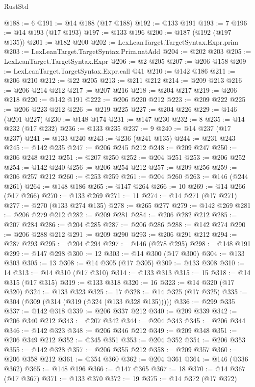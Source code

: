 \begin{lexlean}{RustStd}
\begin{coremodule}
@188 := 6
@191 := @14 @188 (@17 @188)
@192 := @133 @191
@193 := 7
@196 := @14 @193 (@17 @193)
@197 := @133 @196
@200 := @187 (@192 (@197 @135))
@201 := @182 @200
@202 := LexLeanTarget.TargetSyntax.Expr.prim
@203 := LexLeanTarget.TargetSyntax.Prim.natAdd
@204 := @202 @203
@205 := LexLeanTarget.TargetSyntax.Expr
@206 := @2 @205
@207 := @206 @158
@209 := LexLeanTarget.TargetSyntax.Expr.call @41
@210 := @142 @186
@211 := @206 @210
@212 := @22 @205
@213 := @211 @212
@214 := @209 @213
@216 := @206 @214 @212
@217 := @207 @216
@218 := @204 @217
@219 := @206 @218
@220 := @142 @191
@222 := @206 @220 @212
@223 := @209 @222
@225 := @206 @223 @212
@226 := @219 @225
@227 := @204 @226
@229 := @146 (@201 @227)
@230 := @148 @174
@231 := @147 @230
@232 := 8
@235 := @14 @232 (@17 @232)
@236 := @133 @235
@237 := 9
@240 := @14 @237 (@17 @237)
@241 := @133 @240
@243 := @236 (@241 @135)
@244 := @231 @243
@245 := @142 @235
@247 := @206 @245 @212
@248 := @209 @247
@250 := @206 @248 @212
@251 := @207 @250
@252 := @204 @251
@253 := @206 @252
@254 := @142 @240
@256 := @206 @254 @212
@257 := @209 @256
@259 := @206 @257 @212
@260 := @253 @259
@261 := @204 @260
@263 := @146 (@244 @261)
@264 := @148 @186
@265 := @147 @264
@266 := 10
@269 := @14 @266 (@17 @266)
@270 := @133 @269
@271 := 11
@274 := @14 @271 (@17 @271)
@277 := @270 (@133 @274 @135)
@278 := @265 @277
@279 := @142 @269
@281 := @206 @279 @212
@282 := @209 @281
@284 := @206 @282 @212
@285 := @207 @284
@286 := @204 @285
@287 := @206 @286
@288 := @142 @274
@290 := @206 @288 @212
@291 := @209 @290
@293 := @206 @291 @212
@294 := @287 @293
@295 := @204 @294
@297 := @146 (@278 @295)
@298 := @148 @191
@299 := @147 @298
@300 := 12
@303 := @14 @300 (@17 @300)
@304 := @133 @303
@305 := 13
@308 := @14 @305 (@17 @305)
@309 := @133 @308
@310 := 14
@313 := @14 @310 (@17 @310)
@314 := @133 @313
@315 := 15
@318 := @14 @315 (@17 @315)
@319 := @133 @318
@320 := 16
@323 := @14 @320 (@17 @320)
@324 := @133 @323
@325 := 17
@328 := @14 @325 (@17 @325)
@335 := @304 (@309 (@314 (@319 (@324 (@133 @328 @135)))))
@336 := @299 @335
@337 := @142 @318
@339 := @206 @337 @212
@340 := @209 @339
@342 := @206 @340 @212
@343 := @207 @342
@344 := @204 @343
@345 := @206 @344
@346 := @142 @323
@348 := @206 @346 @212
@349 := @209 @348
@351 := @206 @349 @212
@352 := @345 @351
@353 := @204 @352
@354 := @206 @353
@355 := @142 @328
@357 := @206 @355 @212
@358 := @209 @357
@360 := @206 @358 @212
@361 := @354 @360
@362 := @204 @361
@364 := @146 (@336 @362)
@365 := @148 @196
@366 := @147 @365
@367 := 18
@370 := @14 @367 (@17 @367)
@371 := @133 @370
@372 := 19
@375 := @14 @372 (@17 @372)

\end{coremodule}
\end{lexlean}
